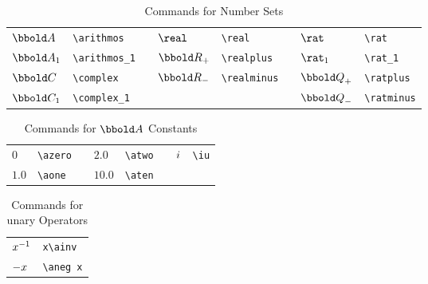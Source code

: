 \documentclass[12pt]{article}
\begin{document}
\begin{table}[htbp]
  \centering
  \begin{tabular}{llp{1cm}llp{1cm}ll}
    $\arithmos$    & \verb|\arithmos| && $\real$ & \verb|\real|&& $\rat$ & \verb|\rat| \\
    $\arithmos_1$  & \verb|\arithmos_1| && $\realplus$ & \verb|\realplus| && $\rat_1$ & \verb|\rat_1| \\
    $\complex$ & \verb|\complex| && $\realminus$ & \verb|\realminus| && $\ratplus$ & \verb|\ratplus| \\ 
    $\complex_1$ & \verb|\complex_1| &&  & && $\ratminus$ & \verb|\ratminus| \\
  \end{tabular}
  \caption{Commands for Number Sets}
  \label{tab:latex-number-sets}
\end{table}
%
\begin{table}[htbp]
  \centering
  \begin{tabular}{llp{1cm}llp{1cm}ll}
    $0$    & \verb|\azero| && $2.0$  & \verb|\atwo| && ${i\mkern1mu}$  & \verb|\iu| \\
    $1.0$  & \verb|\aone| && $10.0$ & \verb|\aten| && & \\
  \end{tabular}
  \caption{Commands for $\arithmos$ Constants}
  \label{tab:latex-constants}
\end{table}
%
\begin{table}[htbp]
  \centering
  \begin{tabular}{ll}
    $x^{-1}$    & \verb|x\ainv| \\
    $- x$    & \verb|\aneg x| \\
  \end{tabular}
  \caption{Commands for unary Operators}
  \label{tab:latex-unary-operators}
\end{table}
%
\end{document}
